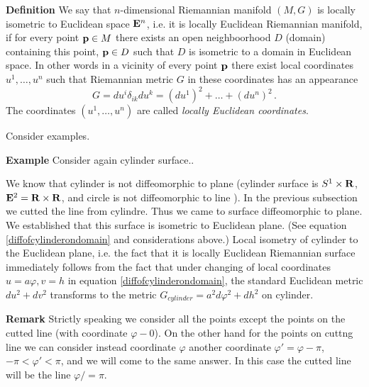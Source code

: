 \documentclass[12pt]{article}
\theoremstyle{theorem}
\numberwithin{equation}{section}
\begin{document}
{\bf Definition} We say that $n$-dimensional Riemannian manifold
$(M,G)$ is locally isometric to Euclidean space ${\bf E}^n$,
i.e.  it is locally Euclidean Riemannian manifold,
if for every point ${\bf p}\in M$ there exists an  open
neighboorhood $D$ (domain) containing this point, ${\bf p}\in D$
such that $D$ is isometric to a domain in Euclidean space. In other words
in a vicinity of every point ${\bf p}$ there exist local coordinates
$u^1,\dots,u^n$ such that Riemannian metric $G$ in
these coordinates has an appearance
            \begin{equation}\label{defofisometrytoEuclid}
           G=du^i\delta_{ik}du^k=(du^1)^2+\dots+(du^n)^2\,.
             \end{equation}
The coordinates $(u^1,\dots,u^n)$  are called
{\it locally Euclidean coordinates}.

\m






   Consider examples.

{\bf Example} Consider again cylinder surface..



 We know that cylinder is not diffeomorphic to plane
(cylinder surface is $S^1\times {\bf R}$, ${\bf E}^2={\bf R}\times {\bf R}$,
 and circle is not diffeomorphic to line ).
 In the previous subsection we cutted the line from cylindre.
Thus we came to surface diffeomorphic to plane. We established that
this surface is isometric to Euclidean plane. (See equation
 \eqref{diffofcylinderondomain} and considerations above.)
Local isometry of cylinder to the Euclidean plane, i.e. the fact
that it is locally Euclidean Riemannian surface
 immediately follows from the fact
that under changing of local coordinates $u=a\varphi, v=h$
  in equation \eqref{diffofcylinderondomain},
the standard Euclidean metric
$du^2+dv^2$ transforms to the metric
$G_{cylinder}=a^2d\varphi^2+dh^2$ on cylinder.

{\bf Remark} Strictly speaking we consider all the points
except the points on the cutted line (with coordinate $\varphi-0$).
On the other hand for the points on cuttng line we can consider
 instead coordinate $\varphi$ another coordinate $\varphi'=\varphi-\pi$,
  $-\pi<\varphi'<\pi$,
and we will come to the same answer. In this case the cutted line
will be the line $\varphi/=\pi$.

  \m
\end{document}
